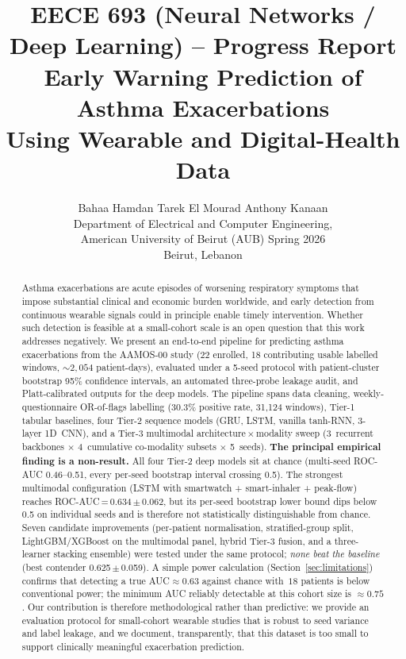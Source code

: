 \documentclass[11pt,a4paper]{article}
\title{%
  \textbf{EECE 693 (Neural Networks / Deep Learning) – Progress Report}\\[6pt]
  \Large Early Warning Prediction of Asthma Exacerbations\\
  Using Wearable and Digital-Health Data}
\author{%
  Bahaa Hamdan \qquad Tarek El Mourad \qquad Anthony Kanaan \\[4pt]
  Department of Electrical and Computer Engineering,\\
  American University of Beirut (AUB) \qquad Spring 2026\\
  Beirut, Lebanon}
\date{}
\begin{document}
\maketitle

\begin{abstract}
Asthma exacerbations are acute episodes of worsening respiratory symptoms
that impose substantial clinical and economic burden worldwide, and early
detection from continuous wearable signals could in principle enable timely
intervention.  Whether such detection is feasible at a small-cohort scale
is an open question that this work addresses negatively.  We present an
end-to-end pipeline for predicting asthma exacerbations from the AAMOS-00
study (22 enrolled, 18 contributing usable labelled windows, ${\sim}2{,}054$
patient-days), evaluated under a 5-seed protocol with patient-cluster
bootstrap 95\% confidence intervals, an automated three-probe leakage
audit, and Platt-calibrated outputs for the deep models.  The pipeline
spans data cleaning, weekly-questionnaire OR-of-flags labelling (30.3\%
positive rate, 31{,}124 windows), Tier-1 tabular baselines, four Tier-2
sequence models (GRU, LSTM, vanilla tanh-RNN, 3-layer 1D~CNN), and a
Tier-3 multimodal architecture\,$\times$\,modality sweep
(3~recurrent backbones $\times$ 4~cumulative co-modality subsets
$\times$ 5~seeds).  \textbf{The principal empirical finding is a
non-result.}  All four Tier-2 deep models sit at chance (multi-seed
ROC-AUC 0.46--0.51, every per-seed bootstrap interval crossing 0.5).  The
strongest multimodal configuration (LSTM with smartwatch + smart-inhaler
+ peak-flow) reaches ROC-AUC\,=\,0.634\,$\pm$\,0.062, but its per-seed
bootstrap lower bound dips below 0.5 on individual seeds and is therefore
not statistically distinguishable from chance.  Seven candidate
improvements (per-patient normalisation, stratified-group split,
LightGBM/XGBoost on the multimodal panel, hybrid Tier-3 fusion, and a
three-learner stacking ensemble) were tested under the same protocol;
\emph{none beat the baseline} (best contender
0.625\,$\pm$\,0.059).  A simple power calculation
(Section~\ref{sec:limitations}) confirms that detecting a true
AUC$\approx$0.63 against chance with~$18$ patients is below conventional
power; the minimum AUC reliably detectable at this cohort size is
${\approx}0.75$.  Our contribution is therefore methodological rather
than predictive: we provide an evaluation protocol for small-cohort
wearable studies that is robust to seed variance and label leakage, and
we document, transparently, that this dataset is too small to support
clinically meaningful exacerbation prediction.
\end{abstract}
\end{document}
